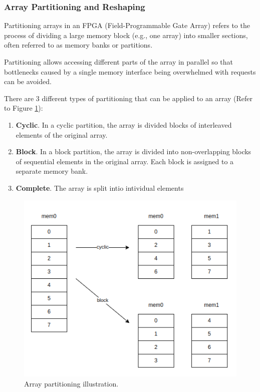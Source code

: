 \documentclass[a4paper, twoside]{report}
\theoremstyle{definition}
\numberwithin{equation}{section}
\begin{document}
\subsubsection{Array Partitioning and Reshaping}

Partitioning arrays in an FPGA (Field-Programmable Gate Array) refers to the
process of dividing a large memory block (e.g., one array) into smaller sections, often referred to
as memory banks or partitions.

Partitioning allows accessing different parts of the array in parallel
so that bottlenecks caused by a single memory interface being overwhelmed with requests
can be avoided.

There are 3 different types of partitioning that can be applied to an array (Refer to Figure \ref{fig:array_partitioning}):

\begin{enumerate}
    \item \textbf{Cyclic}.
          In a cyclic partition, the array is divided blocks of interleaved elements of the original array.
    \item \textbf{Block}.
          In a block partition, the array is divided into non-overlapping blocks of sequential elements in the original array.
          Each block is assigned to a separate memory bank.
    \item \textbf{Complete}.
          The array is split intio intividual elements
\end{enumerate}

\begin{figure}[h!]
    \centering
    \includegraphics[scale=0.5]{array_partition_illust.png}
    \caption{Array partitioning illustration.}
    \label{fig:array_partitioning}
\end{figure}
\end{document}
